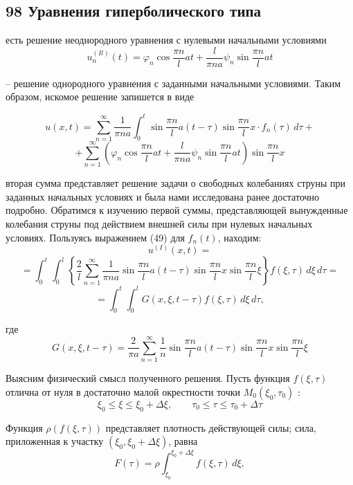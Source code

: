 \documentclass[a4paper, 12pt]{article}
\begin{document}
\begin{center}
\section*{98 \qquad Уравнения гиперболического типа}
\end{center}

есть решение неоднородного уравнения с нулевыми начальными условиями
\[ u_n^{(Il)}(t) = \varphi_n \cos \frac{\pi n}{l} a t + \frac{l}{\pi n a} \psi_n \sin \frac{\pi n}{l} a t \tag{53} \]

-- решение однородного уравнения с заданными начальными условиями. Таким образом, искомое решение запишется в виде

\[ u(x, t) = \sum_{n=1}^\infty \frac{1}{\pi n a} \int_0^t \sin \frac{\pi n}{l} a(t - \tau) \sin \frac{\pi n}{l} x \cdot f_n(\tau) \, d\tau + \]
\[ + \sum_{n=1}^\infty \left( \varphi_n \cos \frac{\pi n}{l} a t + \frac{l}{\pi n a} \psi_n \sin \frac{\pi n}{l} a t \right) \sin \frac{\pi n}{l} x \tag{54} \]

вторая сумма представляет решение задачи о свободных колебаниях струны при заданных начальных условиях и была нами исследована ранее достаточно подробно. Обратимся к изучению первой суммы, представляющей вынужденные колебания струны под действием внешней силы при нулевых начальных условиях. Пользуясь выражением (49) для \(f_n(t)\), находим:
\[ u^{(I)}(x, t) = \]
\[ = \int_0^t \int_0^l \left\{ \frac{2}{l} \sum_{n=1}^\infty \frac{1}{\pi n a} \sin \frac{\pi n}{l} a(t - \tau) \sin \frac{\pi n}{l} x \sin \frac{\pi n}{l} \xi \right\} f(\xi, \tau) \, d\xi \, d\tau = \]
\[ = \int_0^t \int_0^l G(x, \xi, t - \tau) f(\xi, \tau) \, d\xi \, d\tau, \tag{55} \]

где
\[ G(x, \xi, t - \tau) = \frac{2}{\pi a} \sum_{n=1}^\infty \frac{1}{n} \sin \frac{\pi n}{l} a(t - \tau) \sin \frac{\pi n}{l} x \sin \frac{\pi n}{l} \xi \tag{56} \]

Выясним физический смысл полученного решения. Пусть функция \(f(\xi, \tau)\) отлична от нуля в достаточно малой окрестности точки \(M_0(\xi_0, \tau_0)\) :
\[ \xi_0 \le \xi \le \xi_0 + \Delta\xi , \qquad \tau_0 \le \tau \le \tau_0 + \Delta\tau \]

Функция \(\rho(f(\xi, \tau))\) представляет плотность действующей силы; сила, приложенная к участку \((\xi_0, \xi_0 + \Delta \xi)\), равна
\[ F(\tau) = \rho \int_{\xi_0}^{\xi_0 + \Delta \xi} f(\xi, \tau) \, d\xi, \]
\end{document}
